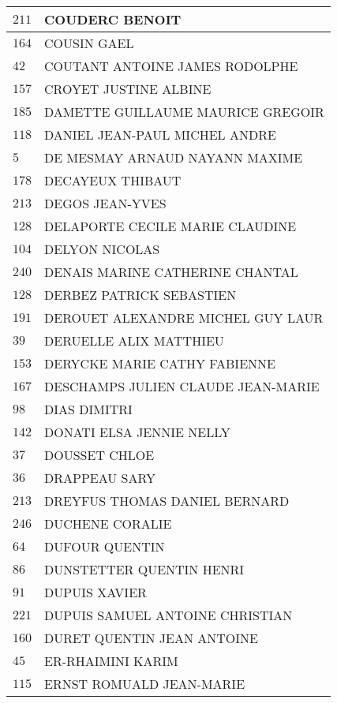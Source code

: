 \begin{xltabular}{\linewidth}{|l|X|}
    $211$ & COUDERC BENOIT \\
    \hline
    $164$ & COUSIN GAEL \\
    \hline
    $42$ & COUTANT ANTOINE JAMES RODOLPHE \\
    \hline
    $157$ & CROYET JUSTINE ALBINE \\
    \hline
    $185$ & DAMETTE GUILLAUME MAURICE GREGOIR \\
    \hline
    $118$ & DANIEL JEAN-PAUL MICHEL ANDRE \\
    \hline
    $5$ & DE MESMAY ARNAUD NAYANN MAXIME \\
    \hline
    $178$ & DECAYEUX THIBAUT \\
    \hline
    $213$ & DEGOS JEAN-YVES \\
    \hline
    $128$ & DELAPORTE CECILE MARIE CLAUDINE \\
    \hline
    $104$ & DELYON NICOLAS \\
    \hline
    $240$ & DENAIS MARINE CATHERINE CHANTAL \\
    \hline
    $128$ & DERBEZ PATRICK SEBASTIEN \\
    \hline
    $191$ & DEROUET ALEXANDRE MICHEL GUY LAUR \\
    \hline
    $39$ & DERUELLE ALIX MATTHIEU \\
    \hline
    $153$ & DERYCKE MARIE CATHY FABIENNE \\
    \hline
    $167$ & DESCHAMPS JULIEN CLAUDE JEAN-MARIE \\
    \hline
    $98$ & DIAS DIMITRI \\
    \hline
    $142$ & DONATI ELSA JENNIE NELLY \\
    \hline
    $37$ & DOUSSET CHLOE \\
    \hline
    $36$ & DRAPPEAU SARY \\
    \hline
    $213$ & DREYFUS THOMAS DANIEL BERNARD \\
    \hline
    $246$ & DUCHENE CORALIE \\
    \hline
    $64$ & DUFOUR QUENTIN \\
    \hline
    $86$ & DUNSTETTER QUENTIN HENRI \\
    \hline
    $91$ & DUPUIS XAVIER \\
    \hline
    $221$ & DUPUIS SAMUEL ANTOINE CHRISTIAN \\
    \hline
    $160$ & DURET QUENTIN JEAN ANTOINE \\
    \hline
    $45$ & ER-RHAIMINI KARIM \\
    \hline
    $115$ & ERNST ROMUALD JEAN-MARIE \\

\end{xltabular}
